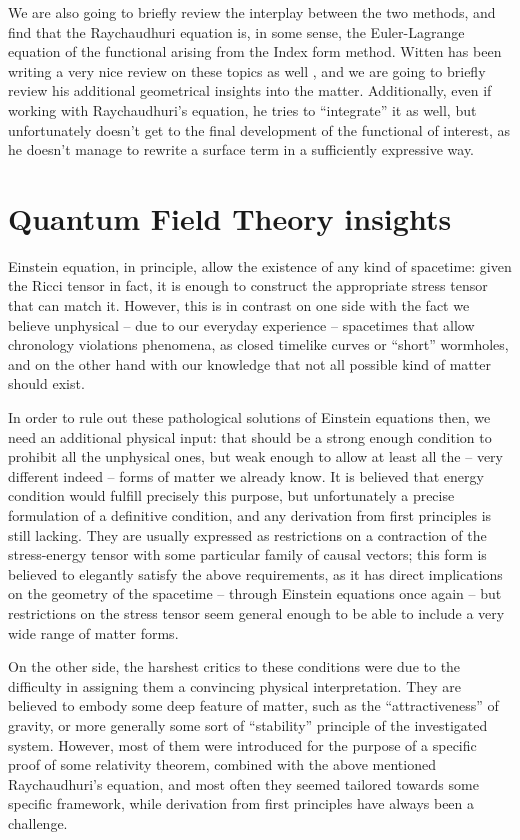 We are also going to briefly review the interplay between the two methods, and find that the Raychaudhuri equation is, in some sense, the Euler-Lagrange equation of the functional arising from the Index form method. Witten has been writing a very nice review on these topics as well \cite[]{witten2020light}, and we are going to briefly review his additional geometrical insights into the matter. Additionally, even if working with Raychaudhuri's equation, he tries to ``integrate'' it as well, but unfortunately doesn't get to the final development of the functional of interest, as he doesn't manage to rewrite a surface term in a sufficiently expressive way.

\section{Quantum Field Theory insights}
Einstein equation, in principle, allow the existence of any kind of spacetime: given the Ricci tensor in fact, it is enough to construct the appropriate stress tensor that can match it. However, this is in contrast on one side with the fact we believe unphysical -- due to our everyday experience -- spacetimes that allow chronology violations phenomena, as closed timelike curves or ``short'' wormholes, and on the other hand with our knowledge that not all possible kind of matter should exist.

In order to rule out these pathological solutions of Einstein equations then, we need an additional physical input: that should be a strong enough condition to prohibit all the unphysical ones, but weak enough to allow at least all the -- very different indeed -- forms of matter we already know.
It is believed that energy condition would fulfill precisely this purpose, but unfortunately a precise formulation of a definitive condition, and any derivation from first principles is still lacking. They are usually expressed as restrictions on a contraction of the stress-energy tensor with some particular family of causal vectors; this form is believed to elegantly satisfy the above requirements, as it has direct implications on the geometry of the spacetime -- through Einstein equations once again -- but restrictions on the stress tensor seem general enough to be able to include a very wide range of matter forms.

On the other side, the harshest critics to these conditions were due to the difficulty in assigning them a convincing physical interpretation. They are believed to embody some deep feature of matter, such as the ``attractiveness'' of gravity, or more generally some sort of ``stability'' principle of the investigated system.
However, most of them were introduced for the purpose of a specific proof of some relativity theorem, combined with the above mentioned Raychaudhuri's equation, and most often they seemed tailored towards some specific framework, while derivation from first principles have always been a challenge.

